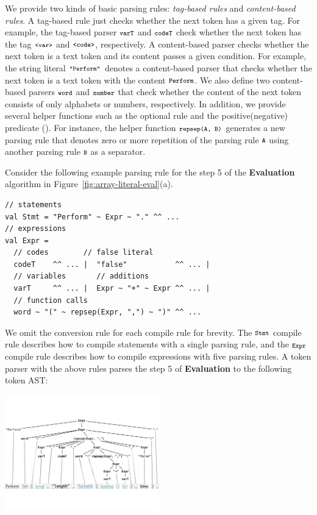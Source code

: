 We provide two kinds of basic parsing rules: \textit{tag-based rules} and
\textit{content-based rules}.  A tag-based rule just checks whether the next
token has a given tag.  For example, the tag-based parser \( \texttt{\footnotesize varT} \) and
\( \texttt{\footnotesize codeT} \) check whether the next token has the tag \( \texttt{\footnotesize<var>} \)
and \( \texttt{\footnotesize<code>} \), respectively.  A content-based parser checks whether
the next token is a text token and its content passes a given condition.  For
example, the string literal \( \texttt{\footnotesize"Perform"} \) denotes a content-based
parser that checks whether the next token is a text token with the content \(
\texttt{\footnotesize Perform} \).  We also define two content-based parsers \( \texttt{\footnotesize word} \)
and \( \texttt{\footnotesize number} \) that check whether the content of the next token
consists of only alphabets or numbers, respectively.  In addition, we provide
several helper functions such as the optional rule  and
the positive(negative) predicate ().  For instance, the helper
function \( \texttt{\footnotesize repsep(A, B)} \) generates a new parsing rule that denotes
zero or more repetition of the parsing rule \( \texttt{\footnotesize A} \) using another parsing
rule \( \texttt{\footnotesize B} \) as a separator.

Consider the following example parsing rule for the step 5 of the
\textbf{Evaluation} algorithm in Figure~\ref{fig:array-literal-eval}(a).
\begin{lstlisting}[style=myScalastyle]
// statements
val Stmt = "Perform" ~ Expr ~ "." ^^ ...
// expressions
val Expr =
  // codes        // false literal
  codeT    ^^ ... |  "false"           ^^ ... |
  // variables       // additions
  varT     ^^ ... |  Expr ~ "+" ~ Expr ^^ ... |
  // function calls
  word ~ "(" ~ repsep(Expr, ",") ~ ")" ^^ ...
\end{lstlisting}
We omit the conversion rule for each compile rule for brevity.  The \(
\texttt{\footnotesize Stmt} \) compile rule  describes how to compile statements with a single
parsing rule, and the \( \texttt{\footnotesize Expr} \) compile rule describes how to compile
expressions with five parsing rules.  A token parser with the above rules parses
the step 5 of \textbf{Evaluation} to the following token AST:
\begin{center}
  \includegraphics[width=0.5\textwidth]{img/token-ast.pdf}
\end{center}


